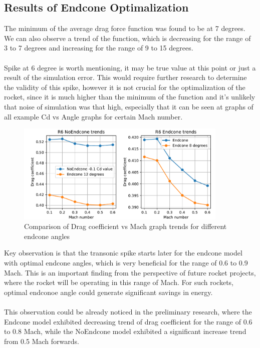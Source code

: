 \documentclass{article}
\begin{document}
\subsection{Results of Endcone Optimalization}
The minimum of the average drag force function was found to be at 7 degrees. We can also 
observe a trend of the function, which is decreasing for the range of 3 to 7 degrees and increasing
for the range of 9 to 15 degrees.\\\\
Spike at 6 degree is worth mentioning, it may be true value at this point or just a result of
the simulation error. This would require further research to determine the validity of this spike, however 
it is not crucial for the optimalization of the rocket, since it is much higher than the minimum 
of the function and it's unlikely that noise of simulation was that high, especially that it can 
be seen at graphs of all example Cd vs Angle graphs for certain Mach number.
\begin{figure}[H]
    \centering
    \includegraphics[width=0.9\textwidth]{../data/R6-Parametric-Endcone/comparisone2plots.pdf}
    \caption{Comparison of Drag coefficient vs Mach graph trends for different endcone angles}
\end{figure}
\noindent Key observation is that the transonic spike starts later for the endcone model with optimal
endcone angles, which
is very beneficial for the range of 0.6 to 0.9 Mach. This is an important finding from the
perspective of future rocket projects, where the rocket will be operating in this range of Mach.
For such rockets, optimal endconoe angle could generate significant savings in energy.\\\\
This observation could be already noticed in the preliminary research, where the Endcone model
exhibited decreasing trend of drag coefficient for the range of 0.6 to 0.8 Mach, while the NoEndcone
model exhibited a significant increase trend from 0.5 Mach forwards.
\end{document}
